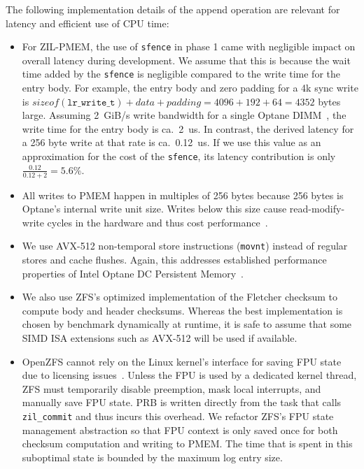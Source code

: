\documentclass[12pt,a4paper,twoside]{book}
\begin{document}
{The following implementation details of the append operation are relevant for latency and efficient use of CPU time:
\begin{itemize}[noitemsep]
    \item For ZIL-PMEM, the use of \lstinline{sfence} in phase 1 came with negligible impact on overall latency during development.
        We assume that this is because the wait time added by the \lstinline{sfence} is negligible compared to the write time for the entry body.
        For example, the entry body and zero padding for a 4k sync write is $sizeof(\mathtt{lr\_write\_t}) + data + padding = 4096 + 192 + 64 = 4352$ bytes large.
        Assuming 2~GiB/s write bandwidth for a single Optane DIMM~\cite{yangEmpiricalGuideBehavior2020}, the write time for the entry body is ca.~2~us.
        In contrast, the derived latency for a 256 byte write at that rate is ca.~0.12~us.
        If we use this value as an approximation for the cost of the \lstinline{sfence}, its latency contribution is only $\frac{0.12}{0.12 + 2} = 5.6\%$.
    \item All writes to PMEM happen in multiples of 256 bytes because 256 bytes is Optane's internal write unit size.
        Writes below this size cause read-modify-write cycles in the hardware and thus cost performance~\cite{yangEmpiricalGuideBehavior2020,zhangChameleonDBKeyvalueStore2021}.
    \item We use AVX-512 non-temporal store instructions (\lstinline{movnt}) instead of regular stores and cache flushes.
        Again, this addresses established performance properties of Intel Optane DC Persistent Memory~\cite{yangEmpiricalGuideBehavior2020}.
    \item We also use ZFS's optimized implementation of the Fletcher checksum to compute body and header checksums.
        Whereas the best implementation is chosen by benchmark dynamically at runtime, it is safe to assume that some SIMD ISA extensions such as AVX-512 will be used if available.
    \item OpenZFS cannot rely on the Linux kernel's interface for saving FPU state due to licensing issues~\cite{LinuxCompatSIMD}.
        Unless the FPU is used by a dedicated kernel thread, ZFS must temporarily disable preemption, mask local interrupts, and manually save FPU state.
        PRB is written directly from the task that calls \lstinline{zil_commit} and thus incurs this overhead.
        We refactor ZFS's FPU state management abstraction so that FPU context is only saved once for both checksum computation and writing to PMEM.
        The time that is spent in this suboptimal state is bounded by the maximum log entry size.
\end{itemize}


}
\end{document}
